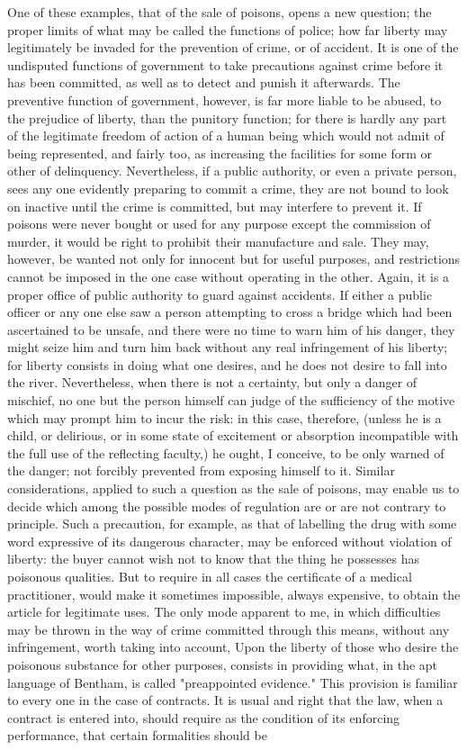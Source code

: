 \documentclass[12pt]{report}
\begin{document}
One of these examples, that of the sale of poisons, opens a new question; the proper limits of what may be called the functions of police; how far liberty may legitimately be invaded for the prevention of crime, or of accident. It is one of the undisputed functions of government to take precautions against crime before it has been committed, as well as to detect and punish it afterwards. The preventive function of government, however, is far more liable to be abused, to the prejudice of liberty, than the punitory function; for there is hardly any part of the legitimate freedom of action of a human being which would not admit of being represented, and fairly too, as increasing the facilities for some form or other of delinquency. Nevertheless, if a public authority, or even a private person, sees any one evidently preparing to commit a crime, they are not bound to look on inactive until the crime is committed, but may interfere to prevent it. If poisons were never bought or used for any purpose except the commission of murder, it would be right to prohibit their manufacture and sale. They may, however, be wanted not only for innocent but for useful purposes, and restrictions cannot be imposed in the one case without operating in the other. Again, it is a proper office of public authority to guard against accidents. If either a public officer or any one else saw a person attempting to cross a bridge which had been ascertained to be unsafe, and there were no time to warn him of his danger, they might seize him and turn him back without any real infringement of his liberty; for liberty consists in doing what one desires, and he does not desire to fall into the river. Nevertheless, when there is not a certainty, but only a danger of mischief, no one but the person himself can judge of the sufficiency of the motive which may prompt him to incur the risk: in this case, therefore, (unless he is a child, or delirious, or in some state of excitement or absorption incompatible with the full use of the reflecting faculty,) he ought, I conceive, to be only warned of the danger; not forcibly prevented from exposing himself to it. Similar considerations, applied to such a question as the sale of poisons, may enable us to decide which among the possible modes of regulation are or are not contrary to principle. Such a precaution, for example, as that of labelling the drug with some word expressive of its dangerous character, may be enforced without violation of liberty: the buyer cannot wish not to know that the thing he possesses has poisonous qualities. But to require in all cases the certificate of a medical practitioner, would make it sometimes impossible, always expensive, to obtain the article for legitimate uses. The only mode apparent to me, in which difficulties may be thrown in the way of crime committed through this means, without any infringement, worth taking into account, Upon the liberty of those who desire the poisonous substance for other purposes, consists in providing what, in the apt language of Bentham, is called "preappointed evidence." This provision is familiar to every one in the case of contracts. It is usual and right that the law, when a contract is entered into, should require as the condition of its enforcing performance, that certain formalities should be 
\end{document}
